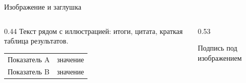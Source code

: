 \begin{frame}{Изображение и заглушка}
  \begin{columns}[T]
    \begin{column}{0.44\textwidth}
       Текст рядом с иллюстрацией: итоги, цитата,
      краткая таблица результатов.

      \smallskip
      {\small
      \begin{tabular}{@{}p{}>{\raggedleft\arraybackslash}p{}@{}}
        \toprule
        Показатель A & значение \\
        Показатель B & значение \\
        \bottomrule
      \end{tabular}}
    \end{column}
    \begin{column}{0.53\textwidth}
      \centering

      \smallskip
      {\scriptsize\color{acGray}Подпись под изображением}
    \end{column}
  \end{columns}
\end{frame}
